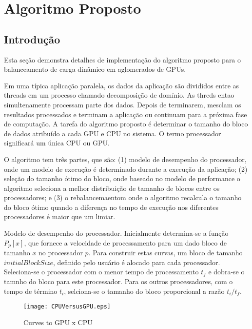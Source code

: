 \pagestyle{empty}
\cleardoublepage
\pagestyle{fancy}

\chapter{Algoritmo Proposto}\label{cap4}

\section{Introdução}\label{cap4:intro}

Esta seção demonstra detalhes de implementação do algoritmo proposto para o balanceamento de carga dinâmico em aglomerados de GPUs. 

Em uma típica aplicação paralela, os dados da aplicação são divididos entre as threads em um processo chamado decomposição de domínio. As threds entao simultenamente processam parte dos dados. Depois de terminarem, mesclam os resultados processados e terminam a aplicação ou continuam para a próxima fase de computação. A tarefa do algoritmo proposto é determinar o tamanho do bloco de dados atribuído a cada GPU e CPU no sistema. O termo processador significará um única CPU ou GPU.

O algoritmo tem três partes, que são: (1) modelo de desempenho do processador, onde um modelo de execução é determinado durante a execução da aplicação; (2) seleção do tamanho ótimo do bloco, onde baseado no modelo de performance o algoritmo seleciona a melhor distribuição de tamanho de blocos entre os processadores; e (3) o rebalancemaentom onde o algoritmo recalcula o tamanho do bloco ótimo quando a diferença no tempo de execução nos diferentes processadores é maior que um limiar.

Modelo de desempenho do processador. Inicialmente determina-se a função $P_p[x]$, que fornece a velocidade de processamento para um dado bloco de tamanho $x$ no processador $p$. Para construir estas curvas, um bloco de tamanho $initialBlockSize$, definido pelo usuário é alocado para cada processador. Seleciona-se o processador com o menor tempo de processamento $t_f$ e dobra-se o tamnho do bloco para este processador. Para os outros processadores, com o tempo de término $t_i$, selciona-se o tamanho do bloco proporcional a razão $t_i/t_f$.


\begin{figure*}[htb]
	\begin{center}
	\centering
			\texttt{[image: CPUVersusGPU.eps]}
	\caption{Curves to GPU x CPU}
	\label{fig:CPUVersusGPU}
	\end{center}
\end{figure*}


